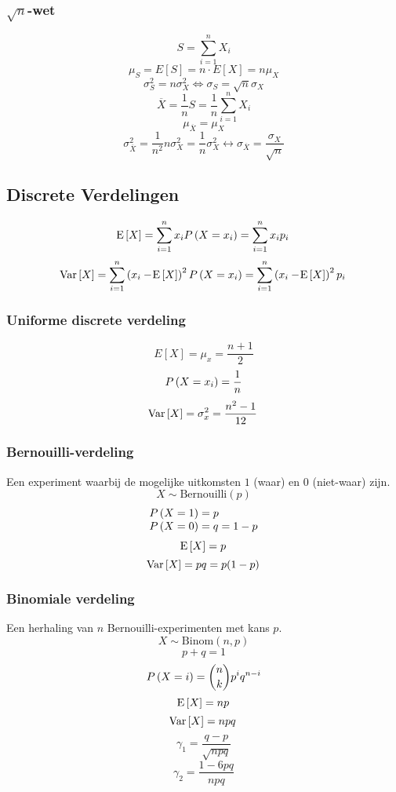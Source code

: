   \subsubsection{\texorpdfstring{$\sqrt{n}$-wet}{Wortel-n-wet}}
  \label{sec:SqrtNWet}
    \[
      S = \sum^n_{i=1} X_i
    \]
    \[
      \mu_S = E\left[S\right] = n \cdot E\left[X\right] = n\mu_X
    \]
    \[
      \sigma^2_S = n \sigma^2_X \Leftrightarrow \sigma_S = \sqrt{n}\sigma_X
    \]
    \[
      \overline{X} = \frac{1}{n}S = \frac{1}{n}\sum_{i=1}^n X_i
    \]
    \[
      \mu_{\overline{X}} = \mu_X
    \]
    \[
      \sigma^2_{\overline{X}}= \frac{1}{n^2}n\sigma^2_X = \frac{1}{n}\sigma_X^2
      \leftrightarrow \sigma_{\overline{X}}=\frac{\sigma_X}{\sqrt{n}}
    \]

\subsection{Discrete Verdelingen}
\label{sec:DiscreteVerdelingen}
  \[
    \!\mathrm{E}\left[ X \right] = \sum^n_{i=1} x_i P\left(X=x_i\right) = \sum^n_{i=1} x_i p_i
  \]
  \[
    \!\mathrm{Var}\left[ X \right] = \sum^n_{i=1}\left(x_i-\!\mathrm{E}\left[ X \right]\right)^2 P\left(X=x_i\right)
                      = \sum^n_{i=1}\left(x_i-\!\mathrm{E}\left[ X \right]\right)^2 p_i
  \]

  \subsubsection{Uniforme discrete verdeling}
  \label{sec:UniformeDiscreteVerdeling}
    \[
      E\left[X\right] = \mu_x = \frac{n+1}{2}
    \]
    \[
      P\left(X=x_i\right) = \frac{1}{n}
    \]
    \[
      \!\mathrm{Var}\left[ X \right] = \sigma^2_x = \frac{n^2-1}{12}
    \]


    \subsubsection{Bernouilli-verdeling}
    Een experiment waarbij de mogelijke uitkomsten $1$ (waar) en $0$ (niet-waar) zijn.
    \[
      X \sim \mathrm{Bernouilli}\left(p\right)
    \]
    \[
      \begin{array}{l}
        P\left(X = 1\right) = p\\
        P\left(X = 0\right) = q = 1 - p
      \end{array}
    \]
    \[
      \!\mathrm{E}\left[ X \right] = p
    \]
    \[
      \!\mathrm{Var}\left[ X \right] = pq = p(1-p)
    \]

  \subsubsection{Binomiale verdeling}
  \label{sec:BinomialeVerdeling}
  Een herhaling van $n$ Bernouilli-experimenten met kans $p$.
    \[
       X \sim \mathrm{Binom}\left(n,p\right)
    \]
    \[
      p + q = 1
    \]
    \[
      P\left(X=i\right) = \binom{n}{k} p^iq^{n-i}
    \]
    \[
      \!\mathrm{E}\left[ X \right] = np
    \]
    \[
      \!\mathrm{Var}\left[ X \right] = npq
    \]
    \[
     \gamma_1 = \frac{q-p}{\sqrt{npq}}
    \]
    \[
      \gamma_2 = \frac{1-6pq}{npq}
    \]

